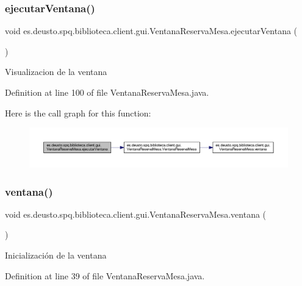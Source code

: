 \subsubsection{\texorpdfstring{ejecutar\+Ventana()}{ejecutarVentana()}}
{\footnotesize\ttfamily void es.\+deusto.\+spq.\+biblioteca.\+client.\+gui.\+Ventana\+Reserva\+Mesa.\+ejecutar\+Ventana (\begin{DoxyParamCaption}{ }\end{DoxyParamCaption})}

Visualizacion de la ventana 

Definition at line 100 of file Ventana\+Reserva\+Mesa.\+java.

Here is the call graph for this function\+:
\nopagebreak
\begin{figure}[H]
\begin{center}
\leavevmode
\includegraphics[width=350pt]{classes_1_1deusto_1_1spq_1_1biblioteca_1_1client_1_1gui_1_1_ventana_reserva_mesa_ae2adaaebc76093cbdf64c2f859bc44d8_cgraph}
\end{center}
\end{figure}
\mbox{\label{classes_1_1deusto_1_1spq_1_1biblioteca_1_1client_1_1gui_1_1_ventana_reserva_mesa_a4b8df9a84d5e9378de27ca0e1aaaa690}} 
\subsubsection{\texorpdfstring{ventana()}{ventana()}}
{\footnotesize\ttfamily void es.\+deusto.\+spq.\+biblioteca.\+client.\+gui.\+Ventana\+Reserva\+Mesa.\+ventana (\begin{DoxyParamCaption}{ }\end{DoxyParamCaption})}

Inicialización de la ventana 

Definition at line 39 of file Ventana\+Reserva\+Mesa.\+java.

